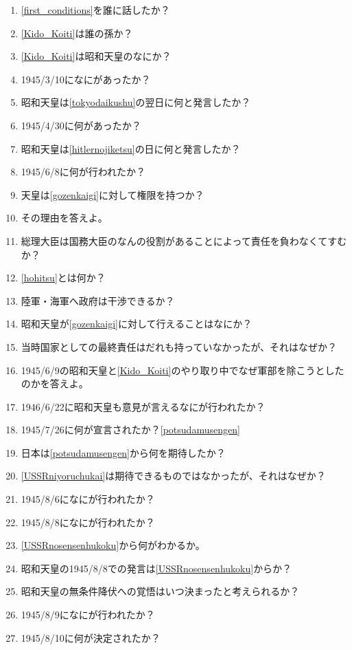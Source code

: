 \documentclass[]{jsarticle}
\begin{document}
\begin{enumerate}
	\item \ref{first_conditions}を誰に話したか？\label{Kido_Koiti}
	\item \ref{Kido_Koiti}は誰の孫か？
	\item \ref{Kido_Koiti}は昭和天皇のなにか？
	\item 1945/3/10になにがあったか？\label{tokyodaikushu}
	\item 昭和天皇は\ref{tokyodaikushu}の翌日に何と発言したか？
	\item 1945/4/30に何があったか？\label{hitlernojiketsu}
	\item 昭和天皇は\ref{hitlernojiketsu}の日に何と発言したか？
	\item 1945/6/8に何が行われたか？\label{gozenkaigi}
	\item 天皇は\ref{gozenkaigi}に対して権限を持つか？
	\item その理由を答えよ。
	\item 総理大臣は国務大臣のなんの役割があることによって責任を負わなくてすむか？\label{hohitsu}
	\item \ref{hohitsu}とは何か？
	\\
	\item 陸軍・海軍へ政府は干渉できるか？
	\item 昭和天皇が\ref{gozenkaigi}に対して行えることはなにか？
	\item 当時国家としての最終責任はだれも持っていなかったが、それはなぜか？
	\item 1945/6/9の昭和天皇と\ref{Kido_Koiti}のやり取り中でなぜ軍部を除こうとしたのかを答えよ。
	\item 1946/6/22に昭和天皇も意見が言えるなにが行われたか？
	\item 1945/7/26に何が宣言されたか？\ref{potsudamusengen}
	\item 日本は\ref{potsudamusengen}から何を期待したか？\label{USSRniyoruchukai}
	\item \ref{USSRniyoruchukai}は期待できるものではなかったが、それはなぜか？
	\item 1945/8/6になにが行われたか？
	\item 1945/8/8になにが行われたか？\label{USSRnosensenhukoku}
	\item \ref{USSRnosensenhukoku}から何がわかるか。
	\item 昭和天皇の1945/8/8での発言は\ref{USSRnosensenhukoku}からか？
	\item 昭和天皇の無条件降伏への覚悟はいつ決まったと考えられるか？
	\item 1945/8/9になにが行われたか？
	\item 1945/8/10に何が決定されたか？

\end{enumerate}
\end{document}
